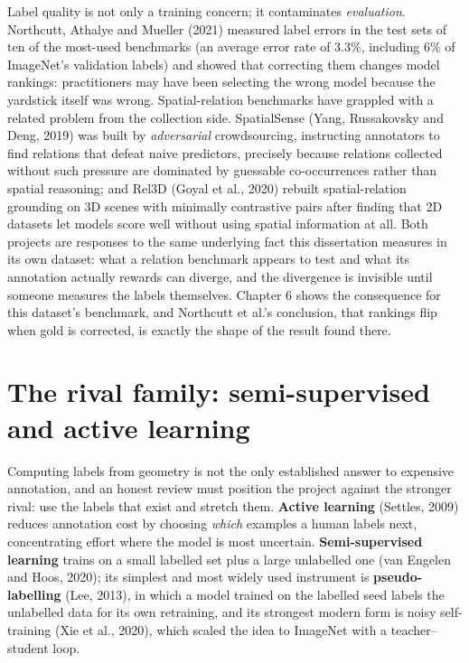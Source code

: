 Label quality is not only a training concern; it contaminates \textit{evaluation}. Northcutt, Athalye and Mueller (2021) measured label errors in the test sets of ten of the most-used benchmarks (an average error rate of 3.3\%, including 6\% of ImageNet's validation labels) and showed that correcting them changes model rankings: practitioners may have been selecting the wrong model because the yardstick itself was wrong. Spatial-relation benchmarks have grappled with a related problem from the collection side. SpatialSense (Yang, Russakovsky and Deng, 2019) was built by \textit{adversarial} crowdsourcing, instructing annotators to find relations that defeat naive predictors, precisely because relations collected without such pressure are dominated by guessable co-occurrences rather than spatial reasoning; and Rel3D (Goyal et al., 2020) rebuilt spatial-relation grounding on 3D scenes with minimally contrastive pairs after finding that 2D datasets let models score well without using spatial information at all. Both projects are responses to the same underlying fact this dissertation measures in its own dataset: what a relation benchmark appears to test and what its annotation actually rewards can diverge, and the divergence is invisible until someone measures the labels themselves. Chapter 6 shows the consequence for this dataset's benchmark, and Northcutt et al.'s conclusion, that rankings flip when gold is corrected, is exactly the shape of the result found there.

\section{The rival family: semi-supervised and active learning}

Computing labels from geometry is not the only established answer to expensive annotation, and an honest review must position the project against the stronger rival: use the labels that exist and stretch them. \textbf{Active learning} (Settles, 2009) reduces annotation cost by choosing \textit{which} examples a human labels next, concentrating effort where the model is most uncertain. \textbf{Semi-supervised learning} trains on a small labelled set plus a large unlabelled one (van Engelen and Hoos, 2020); its simplest and most widely used instrument is \textbf{pseudo-labelling} (Lee, 2013), in which a model trained on the labelled seed labels the unlabelled data for its own retraining, and its strongest modern form is noisy self-training (Xie et al., 2020), which scaled the idea to ImageNet with a teacher--student loop.

